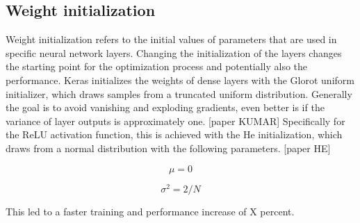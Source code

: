 \documentclass{article}
\begin{document}
\subsection{Weight initialization}
Weight initialization refers to the initial values of parameters that are used in specific neural network layers.
Changing the initialization of the layers changes the starting point for the optimization process and potentially also the performance.
Keras initializes the weights of dense layers with the Glorot uniform initializer, which draws samples from a truncated uniform distribution.
Generally the goal is to avoid vanishing and exploding gradients, even better is if the variance of layer outputs is approximately one. [paper KUMAR]
Specifically for the ReLU activation function, this is achieved with the He initialization, which draws from a normal distribution with the following parameters. [paper HE]\\
\begin{minipage}{.5\linewidth}
  \begin{equation}
    \mu = 0
  \end{equation}
\end{minipage}
\begin{minipage}{.5\linewidth}
  \begin{equation}
    \sigma^2 = 2/N
  \end{equation}
\end{minipage}

This led to a faster training and performance increase of X percent.
\end{document}

